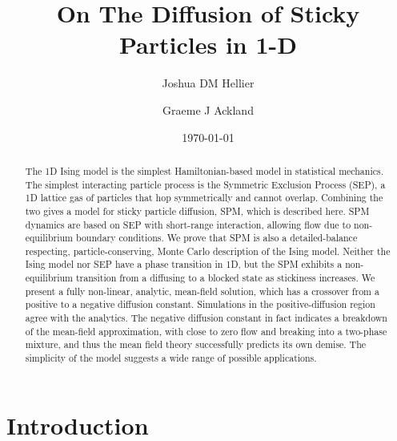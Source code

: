 \documentclass[
reprint, amsmath,amssymb,
]{revtex4-1}
\begin{document}
\title{On The Diffusion of Sticky Particles in 1-D}

\author{Joshua DM Hellier}
\author{Graeme J Ackland}

\date{\today}%

\begin{abstract}
The 1D Ising model is the simplest Hamiltonian-based model in statistical
mechanics. The simplest interacting particle process is the Symmetric
Exclusion Process (SEP), a  1D lattice gas of particles that hop
symmetrically and cannot overlap.  Combining the two gives a model for
sticky particle diffusion, SPM, which is described here.  SPM dynamics
are based on SEP with short-range interaction, allowing flow due to
non-equilibrium boundary conditions.  We prove that SPM is also a
detailed-balance respecting, particle-conserving,  Monte Carlo description of the Ising
model.  Neither the Ising model nor SEP have a phase transition in 1D, but the SPM exhibits a non-equilibrium transition from a
diffusing to a blocked state as stickiness increases.  We present a
fully non-linear, analytic, mean-field solution, which has a crossover
from a positive to a negative diffusion constant.  Simulations in the
positive-diffusion region agree with the analytics. The negative
diffusion constant in fact indicates a breakdown of the mean-field
approximation, with close to zero flow and breaking into a two-phase
mixture, and thus the mean field theory successfully predicts its own
demise.  The simplicity of the model suggests a wide range of
possible applications.


\end{abstract}

\maketitle


\section{Introduction}
\end{document}
